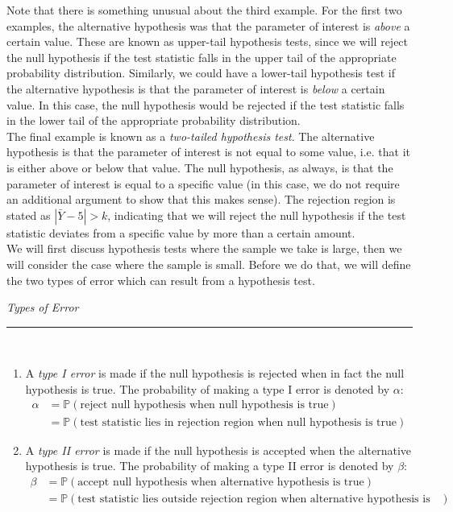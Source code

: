 \documentclass[notes.tex]{subfiles}
\begin{document}
Note that there is something unusual about the third example. For the first two examples, the alternative hypothesis was that the parameter of interest is \emph{above} a certain value. These are known as upper-tail hypothesis tests, since we will reject the null hypothesis if the test statistic falls in the upper tail of the appropriate probability distribution. Similarly, we could have a lower-tail hypothesis test if the alternative hypothesis is that the parameter of interest is \emph{below} a certain value. In this case, the null hypothesis would be rejected if the test statistic falls in the lower tail of the appropriate probability distribution.\\

The final example is known as a \emph{two-tailed hypothesis test}. The alternative hypothesis is that the parameter of interest is not equal to some value, i.e. that it is either above or below that value. The null hypothesis, as always, is that the parameter of interest is equal to a specific value (in this case, we do not require an additional argument to show that this makes sense).
The rejection region is stated as $|\bar{Y} - 5| > k$, indicating that we will reject the null hypothesis if the test statistic deviates from a specific value by more than a certain amount.\\

We will first discuss hypothesis tests where the sample we take is large, then we will consider the case where the sample is small. Before we do that, we will define the two types of error which can result from a hypothesis test.

\begin{framed}
\emph{Types of Error}\\
  \rule{\dimexpr{}\fboxrule}{.1pt} \\
\begin{enumerate}
\item A \emph{type I error} is made if the null hypothesis is rejected when in fact the null hypothesis is true. The probability of making a type I error is denoted by $\alpha$:
\begin{align*}
\alpha &= \mathbb{P}(\mbox{reject null hypothesis when null hypothesis is true})\\
&= \mathbb{P}(\mbox{test statistic lies in rejection region  when null hypothesis is true})
\end{align*}

\item A \emph{type II error} is made if the null hypothesis is accepted when the alternative hypothesis is true. The probability of making a type II error is denoted by $\beta$:
\begin{align*}
\beta &= \mathbb{P}(\mbox{accept null hypothesis when alternative hypothesis is true})\\
&= \mathbb{P}(\mbox{test statistic lies outside rejection region when alternative hypothesis is true})
\end{align*}
\end{enumerate}
\end{framed}
 
\end{document}
